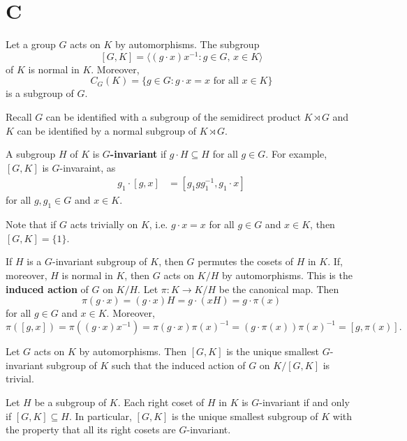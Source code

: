 \section*{C}



Let a group $G$ acts on $K$ by automorphisms. The subgroup
\[
[G,K]=\langle (g\cdot x)x^{-1}:g\in G,\,x\in K\rangle
\]
of $K$ is normal in $K$. Moreover, 
\[
C_G(K)=\{g\in G:g\cdot x=x\text{ for all $x\in K$}\}
\]
is a subgroup of $G$. 

Recall $G$ can be identified with a subgroup
of the semidirect product $K\rtimes G$ and $K$ can be identified by a normal 
subgroup of $K\rtimes G$. 

A subgroup $H$ of $K$ is \textbf{$G$-invariant} if $g\cdot H\subseteq H$ for all $g\in G$. 
For example, $[G,K]$ is $G$-invaraint, as
\begin{align*}
g_1\cdot [g,x]&=[g_1gg_1^{-1}, g_1\cdot x]
\end{align*}
for all $g,g_1\in G$ and $x\in K$.

Note that if $G$ acts trivially on $K$, i.e. $g\cdot x=x$ for all $g\in G$ and $x\in K$, then 
$[G,K]=\{1\}$. 

If $H$ is a $G$-invariant subgroup of $K$, then $G$ permutes the cosets of $H$ in $K$. If, moreover, $H$ is normal in $K$, then
$G$ acts on $K/H$ by automorphisms. This is the \textbf{induced action} of $G$ on $K/H$. Let $\pi\colon K\to K/H$ be the canonical
map. Then 
\[
\pi(g\cdot x)=(g\cdot x)H=g\cdot (xH)=g\cdot\pi(x)
\]
for all $g\in G$ and $x\in K$. Moreover, 
\[
\pi([g,x])=\pi( (g\cdot x)x^{-1})=\pi(g\cdot x)\pi(x)^{-1}=(g\cdot\pi(x))\pi(x)^{-1}=[g,\pi(x)].
\]

\begin{exercise}
Let $G$ acts on $K$ by automorphisms. Then $[G,K]$ is the unique smallest $G$-invariant 
subgroup of $K$ such that the induced action of $G$ on $K/[G,K]$ is trivial. 	
\end{exercise}


\begin{proposition}
Let $H$ be a subgroup of $K$. Each right coset of $H$ in $K$ is $G$-invariant if and only if 
$[G,K]\subseteq H$. In particular, $[G,K]$ is the unique smallest subgroup of $K$ with the 
property that all its right cosets are $G$-invariant. 	
\end{proposition}

